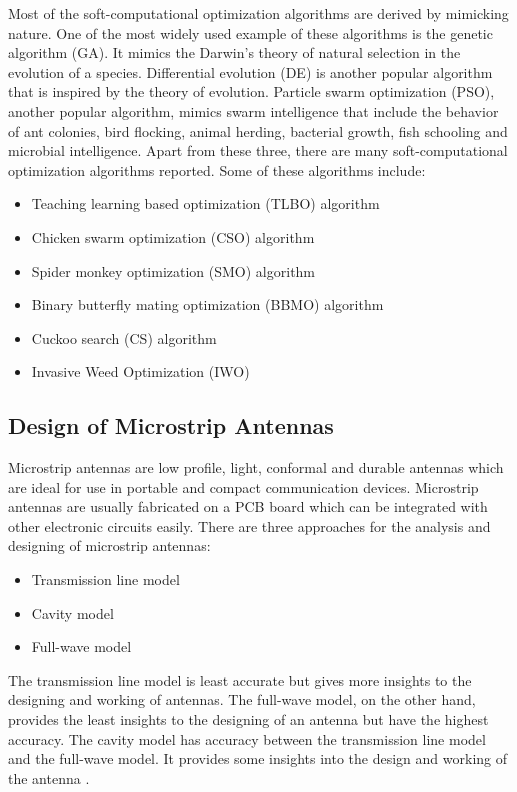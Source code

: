 Most of the soft-computational optimization algorithms are derived by mimicking nature. One of the most widely used example of these algorithms is the genetic algorithm (GA). It mimics the Darwin's theory of natural selection in the evolution of a species. Differential evolution (DE) is another popular algorithm that is inspired by the theory of evolution. Particle swarm optimization (PSO), another popular algorithm, mimics swarm intelligence that include the behavior of ant colonies, bird flocking, animal herding, bacterial growth, fish schooling and microbial intelligence. Apart from these three, there are many soft-computational optimization algorithms reported. Some of these algorithms include:
\begin{itemize}
\item Teaching learning based optimization (TLBO) algorithm \cite{arraySynth3}
\item Chicken swarm optimization (CSO) algorithm \cite{arraySynth4}
\item Spider monkey optimization (SMO) algorithm \cite{arrayThin1}
\item Binary butterfly mating optimization (BBMO) algorithm \cite{arrayThin2}
\item Cuckoo search (CS) algorithm \cite{CuckooSerach}
\item Invasive Weed Optimization (IWO) \cite{InvasiveWeed}
\end{itemize}

\subsection{Design of Microstrip Antennas}
Microstrip antennas are low profile, light, conformal and durable antennas which are ideal for use in portable and compact communication devices. Microstrip antennas are usually fabricated on a PCB board which can be integrated with other electronic circuits easily. There are three approaches for the analysis and designing of microstrip antennas:
\begin{itemize}
\item Transmission line model
\item Cavity model
\item Full-wave model
\end{itemize}

The transmission line model is least accurate but gives more insights to the designing and working of antennas. The full-wave model, on the other hand, provides the least insights to the designing of an antenna but have the highest accuracy. The cavity model has accuracy between the transmission line model and the full-wave model. It provides some insights into the design and working of the antenna \cite{balanis}.

